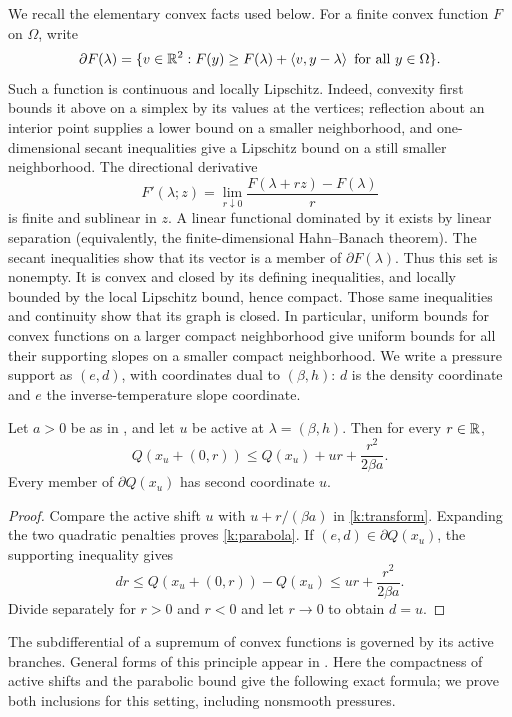We recall the elementary convex facts used below.  For a finite convex
function $F$ on $\Omega$, write
\[
 \partial F(\lambda)=
 \{v\in\mathbb R^2:F(y)\ge F(\lambda)+\left\langle v,y-\lambda\right\rangle
                         \text{ for all }y\in\Omega\}.
\]
Such a function is continuous and locally Lipschitz.  Indeed, convexity
first bounds it above on a simplex by its values at the vertices;
reflection about an interior point supplies a lower bound on a smaller
neighborhood, and one-dimensional secant inequalities give a Lipschitz
bound on a still smaller neighborhood.  The directional derivative
\[
 F'(\lambda;z)=\lim_{r\downarrow0}
       \frac{F(\lambda+rz)-F(\lambda)}r
\]
is finite and sublinear in $z$.  A linear functional dominated by it
exists by linear separation (equivalently, the finite-dimensional
Hahn--Banach theorem).  The secant inequalities show that its vector is
a member of $\partial F(\lambda)$.  Thus this set is nonempty.  It is
convex and closed by its defining inequalities, and locally bounded by
the local Lipschitz bound, hence compact.  Those same inequalities and
continuity show that its graph is closed.  In particular, uniform bounds
for convex functions on a larger compact neighborhood give uniform bounds
for all their supporting slopes on a smaller compact neighborhood.
We write a pressure support as $(e,d)$, with coordinates dual to
$(\beta,h)$: $d$ is the density coordinate and $e$ the
inverse-temperature slope coordinate.

\begin{lemma}
\label{k:active-parabola}
Let $a>0$ be as in , and let $u$ be active
at $\lambda=(\beta,h)$.  Then for every $r\in\mathbb R$,
\begin{equation}
 Q(x_u+(0,r))\le Q(x_u)+ur+\frac{r^2}{2\beta a}.
 \label{k:parabola}
\end{equation}
Every member of $\partial Q(x_u)$ has second coordinate $u$.
\end{lemma}

\begin{proof}
Compare the active shift $u$ with $u+r/(\beta a)$ in
\eqref{k:transform}.  Expanding the two quadratic penalties proves
\eqref{k:parabola}.  If $(e,d)\in\partial Q(x_u)$, the supporting
inequality gives
\[
 dr\le Q(x_u+(0,r))-Q(x_u)
       \le ur+\frac{r^2}{2\beta a}.
\]
Divide separately for $r>0$ and $r<0$ and let $r\to0$ to obtain $d=u$.
\end{proof}

The subdifferential of a supremum of convex functions is governed by
its active branches.  General forms of this principle appear in
\citet[p.~864]{HantouteLopezZalinescu2008}.  Here the compactness of
active shifts and the parabolic bound give the following exact formula;
we prove both inclusions for this setting, including nonsmooth pressures.

